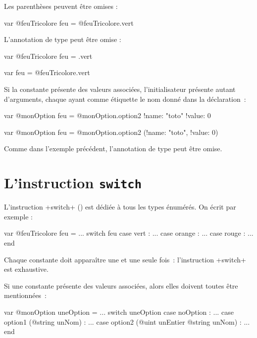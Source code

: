 Les parenthèses peuvent être omises :
\begin{galgas34}
var @feuTricolore feu = @feuTricolore.vert
\end{galgas34}

L'annotation de type peut être omise :

\begin{galgas34}
var @feuTricolore feu = .vert
\end{galgas34}

\begin{galgas34}
var feu = @feuTricolore.vert
\end{galgas34}


Si la constante présente des valeurs associées, l'initialisateur présente autant d'arguments, chaque ayant comme étiquette le nom donné dans la déclaration~:

\begin{galgas3}
var @monOption feu = @monOption.option2 {!name: "toto" !value: 0}
\end{galgas3}

\begin{galgas34}
var @monOption feu = @monOption.option2 (!name: "toto", !value: 0)
\end{galgas34}

Comme dans l'exemple précédent, l'annotation de type peut être omise.








\section{L'instruction \texttt{switch}}

L'instruction \ggst+switch+ () est dédiée à tous les types énumérés. On écrit par exemple :

\begin{galgas34}
var @feuTricolore feu = ...
switch feu
case vert : ...
case orange : ...
case rouge : ...
end
\end{galgas34}

Chaque constante doit apparaître une et une seule fois~: l'instruction \ggst+switch+ est exhaustive.

Si une constante présente des valeurs associées, alors elles doivent toutes être mentionnées~:

\begin{galgas3}
var @monOption uneOption = ...
switch uneOption
case noOption : ...
case option1 (@string unNom) : ...
case option2 (@uint unEntier @string unNom) : ...
end
\end{galgas3}

